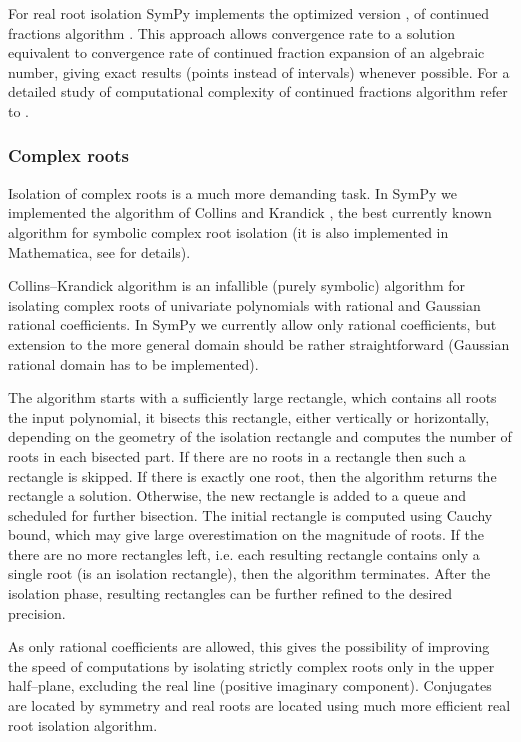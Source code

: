 For real root isolation SymPy implements the optimized version \cite{Akritas2008study},
\cite{Akritas2008improving} of continued fractions algorithm \cite{Collins1976descarte}. This
approach allows convergence rate to a solution equivalent to convergence rate of continued
fraction expansion of an algebraic number, giving exact results (points instead of intervals)
whenever possible. For a detailed study of computational complexity of continued fractions
algorithm refer to \cite{Sharma2007complexity}.


\subsubsection{Complex roots}

Isolation of complex roots is a much more demanding task. In SymPy we implemented the algorithm
of Collins and Krandick \cite{Collins1992infallible}, the best currently known algorithm for symbolic
complex root isolation (it is also implemented in Mathematica, see \cite{Mathematica2009internal} for
details).

Collins--Krandick algorithm is an infallible (purely symbolic) algorithm for isolating complex
roots of univariate polynomials with rational and Gaussian rational coefficients. In SymPy we
currently allow only rational coefficients, but extension to the more general domain should be
rather straightforward (Gaussian rational domain has to be implemented).

The algorithm starts with a sufficiently large rectangle, which contains all roots the input
polynomial, it bisects this rectangle, either vertically or horizontally, depending on the
geometry of the isolation rectangle and computes the number of roots in each bisected part.
If there are no roots in a rectangle then such a rectangle is skipped. If there is exactly
one root, then the algorithm returns the rectangle a solution. Otherwise, the new rectangle
is added to a queue and scheduled for further bisection. The initial rectangle is computed
using Cauchy bound, which may give large overestimation on the magnitude of roots. If the
there are no more rectangles left, i.e. each resulting rectangle contains only a single
root (is an isolation rectangle), then the algorithm terminates. After the isolation phase,
resulting rectangles can be further refined to the desired precision.

As only rational coefficients are allowed, this gives the possibility of improving the speed
of computations by isolating strictly complex roots only in the upper half--plane, excluding
the real line (positive imaginary component). Conjugates are located by symmetry and real
roots are located using much more efficient real root isolation algorithm.

